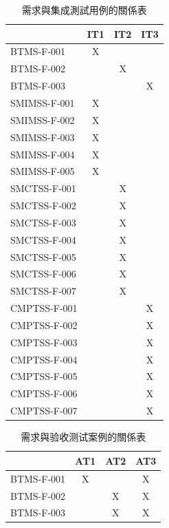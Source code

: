 \begin{enumerate}
						\begin{table}[!htbp]
					\centering
					\caption{需求與集成測試用例的關係表}
					\label{table11}
					\begin{tabular}{|l|c|c|c|}
					\hline
					 & \multicolumn{1}{l|}{IT1} & \multicolumn{1}{l|}{IT2} & \multicolumn{1}{l|}{IT3} \\ \hline
					BTMS-F-001 & X &  &  \\ \hline
					BTMS-F-002 &  & X &  \\ \hline
					BTMS-F-003 &  &  & X \\ \hline
					SMIMSS-F-001 & X &  &  \\ \hline
					SMIMSS-F-002 & X &  &  \\ \hline
					SMIMSS-F-003 & X &  &  \\ \hline
					SMIMSS-F-004 & X &  &  \\ \hline
					SMIMSS-F-005 & X &  &  \\ \hline
					SMCTSS-F-001 &  & X &  \\ \hline
					SMCTSS-F-002 &  & X &  \\ \hline
					SMCTSS-F-003 &  & X &  \\ \hline
					SMCTSS-F-004 &  & X &  \\ \hline
					SMCTSS-F-005 &  & X &  \\ \hline
					SMCTSS-F-006 &  & X &  \\ \hline
					SMCTSS-F-007 &  & X &  \\ \hline
					CMPTSS-F-001 &  &  & X \\ \hline
					CMPTSS-F-002 &  &  & X \\ \hline
					CMPTSS-F-003 & \multicolumn{1}{l|}{} & \multicolumn{1}{l|}{} & X \\ \hline
					CMPTSS-F-004 & \multicolumn{1}{l|}{} & \multicolumn{1}{l|}{} & X \\ \hline
					CMPTSS-F-005 & \multicolumn{1}{l|}{} & \multicolumn{1}{l|}{} & X \\ \hline
					CMPTSS-F-006 & \multicolumn{1}{l|}{} & \multicolumn{1}{l|}{} & X \\ \hline
					CMPTSS-F-007 & \multicolumn{1}{l|}{} & \multicolumn{1}{l|}{} & X \\ \hline
					\end{tabular}
					\end{table}


					\begin{table}[!htbp]
					\centering
					\caption{需求與验收测试案例的關係表}
					\label{table12}
					\begin{tabular}{|l|c|c|c|}
					\hline
					 & \multicolumn{1}{l|}{AT1} & \multicolumn{1}{l|}{AT2} & \multicolumn{1}{l|}{AT3} \\ \hline
					BTMS-F-001 & X &  & X \\ \hline
					BTMS-F-002 &  & X & X \\ \hline
					BTMS-F-003 &  & X & X \\ \hline
					\end{tabular}
					\end{table}



\end{enumerate}
